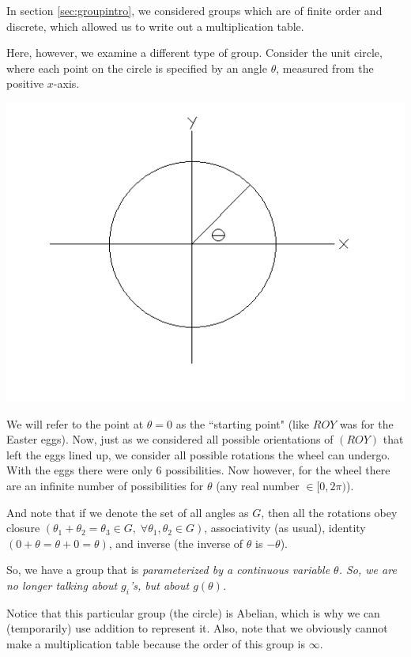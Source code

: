 \documentclass[12pt,epsf]{article}
\begin{document}
In section \ref{sec:groupintro}, we considered groups which are of
finite order and discrete, which allowed us to write out a
multiplication table.  

Here, however, we examine a different type of group.  Consider the unit
circle, where each point on the circle is specified by an angle
$\theta$, measured from the positive $x$-axis.	
\newline
\begin{center}
\includegraphics[scale = .4]{circle.PNG}
\end{center}

We will refer to the point at $\theta=0$ as the ``starting point" (like
$ROY$ was for the Easter eggs).  Now, just as we considered all
possible orientations of $(ROY)$ that left the eggs lined up, we consider
all possible rotations the wheel can undergo.  With the eggs there
were only 6 possibilities.  Now however, for the wheel there are an
infinite number of possibilities for $\theta$ (any real number $\in
[0,2\pi)$).  

And note that if we denote the set of all angles as $G$, then all the
rotations obey closure $(\theta_1+\theta_2 = \theta_3 \in G, \; \forall
\theta_1,\theta_2 \in G)$, associativity (as usual), identity $(0 +
\theta = \theta+0 = \theta)$, and inverse (the inverse of $\theta$ is
$-\theta$).  

So, we have a group that is \it parameterized \rm by a continuous
variable $\theta$.  So, we are no longer talking about $g_i$'s, but
about $g(\theta)$.  

Notice that this particular group (the circle) is Abelian, which is why
we can (temporarily) use addition to represent it.  Also, note that we
obviously cannot make a multiplication table because the order of this
group is $\infty$.  
\end{document}
